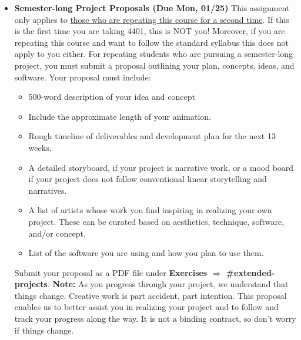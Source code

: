 \def\dMon{Mon, 01/25}
\def\dTues{Tues, 01/26}
\def\dWed{Wed, 01/27}
\def\dThur{Thur, 01/28}
\def\dFri{Fri, 01/29}
\def\dSat{Sat, 01/30}
\def\dSun{Sun, 01/31}
\placeDate

\begin{itemize}[noitemsep,topsep=0pt,leftmargin=*]
    \item \textbf{Semester-long Project Proposals (Due \dMon)} This assignment only applies to \ul{those who are repeating this course for a second time}. If this is the first time you are taking 4401, this is NOT you! Moreover, if you are repeating this course and want to follow the standard syllabus this does not apply to you either. For repeating students who are pursuing a semester-long project, you must submit a proposal outlining your plan, concepts, ideas, and software. Your proposal must include:
          \begin{itemize}
              \item 500-word description of your idea and concept
              \item Include the approximate length of your animation.
              \item Rough timeline of deliverables and development plan for the next 13 weeks.
              \item A detailed storyboard, if your project is narrative work, or a mood board if your project does not follow conventional linear storytelling and narratives.
              \item A list of artists whose work you find inspiring in realizing your own project. These can be curated based on aesthetics, technique, software, and/or concept.
              \item List of the software you are using and how you plan to use them.
          \end{itemize}
    Submit your proposal as a PDF file under \textbf{Exercises $\Rightarrow$ \#extended-projects}. \newline
    \small{\textbf{Note:} As you progress through your project, we understand that things change. Creative work is part accident, part intention. This proposal enables us to better assist you in realizing your project and to follow and track your progress along the way. It is not a binding contract, so don't worry if things change.}
\end{itemize}
\vspace{1em}
